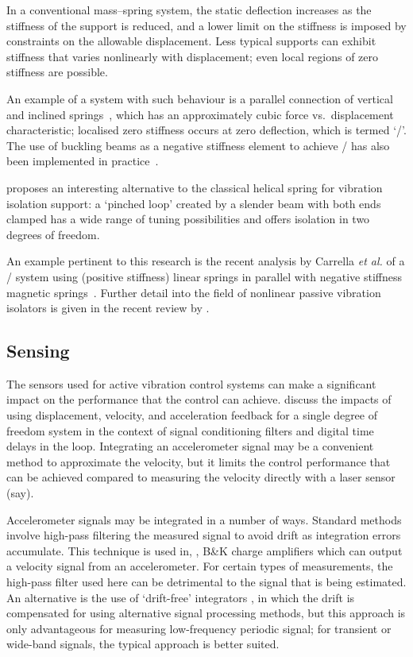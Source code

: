 In a conventional mass--spring system, the static deflection increases
as the stiffness of the support is reduced, and a lower limit on the
stiffness is imposed by constraints on the allowable
displacement. Less typical supports can exhibit stiffness that varies
nonlinearly with displacement; even local regions of zero stiffness
are possible.

An example of a system with such behaviour is a parallel
connection of vertical and inclined
springs~\cite{molyneux1957,alabuzhev1989,carrella2006,carrella2007},
which has an approximately cubic force vs.\ displacement
characteristic; localised zero stiffness occurs at zero deflection,
which is termed `\qzs/'. The use of buckling beams as a negative
stiffness element to achieve \qzs/ has also been implemented in
practice~\cite{platus1999,tarnai2003}.

\textcite{virgin2008} proposes an interesting alternative to the
classical helical spring for vibration isolation support: a `pinched
loop' created by a slender beam with both ends clamped has a wide
range of tuning possibilities and offers isolation in two degrees of
freedom.

An example pertinent to this
research is the recent analysis by Carrella \emph{et al.} of a \qzs/
system using (positive stiffness) linear springs in parallel with negative
stiffness magnetic springs~\cite{carrella2008}. Further detail into the
field  of nonlinear passive vibration isolators is given in the recent
review by \textcite{ibrahim2008}.

\subsection{Sensing}

The sensors used for active vibration control systems can make a
significant impact on the performance that the control can
achieve. \textcite{brennan2007} discuss the impacts of using
displacement, velocity, and acceleration feedback for a single degree
of freedom system in the context of signal conditioning filters and
digital time delays in the loop. Integrating an accelerometer signal
may be a convenient method to approximate the velocity, but it limits
the control performance that can be achieved compared to measuring the
velocity directly with a laser sensor (say).

Accelerometer signals may be integrated in a number of ways. Standard methods
involve high-pass filtering the measured signal to avoid drift as integration
errors accumulate. This technique is used in, \eg, B\&K charge amplifiers
which can output a velocity signal from an accelerometer. For certain types of
measurements, the high-pass filter used here can be detrimental to the signal
that is being estimated. An alternative is the use of `drift-free' integrators
\cite{gavin1998}, in which the drift is compensated for using alternative
signal processing methods, but this approach is only advantageous for
measuring low-frequency periodic signal; for transient or wide-band signals,
the typical approach is better suited.

